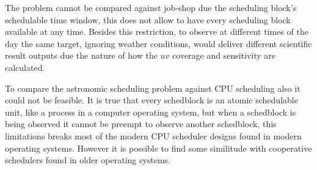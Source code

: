 \documentclass[11pt]{article}
\begin{document}
The problem cannot be compared against job-shop due the scheduling block's schedulable time window, this does not allow to have every scheduling block available at any time. Besides this restriction, to observe at different times of the day the same target, ignoring weather conditions, would deliver different scientific result outputs due the nature of how the $uv$ coverage and sensitivity are calculated.

To compare the astronomic scheduling problem against CPU scheduling also it could not be feasible. It is true that every schedblock is an atomic schedulable unit, like a process in a computer operating system, but when a schedblock is being observed it cannot be preempt to observe another schedblock, this limitations breaks most of the modern CPU scheduler designs found in modern operating systems. However it is possible to find some similitude with cooperative schedulers found in older operating systems.
\end{document}
